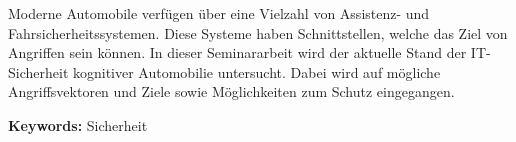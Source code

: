 Moderne Automobile verfügen über eine Vielzahl von Assistenz- und
Fahrsicherheitssystemen. Diese Systeme haben Schnittstellen, welche das Ziel
von Angriffen sein können. In dieser Seminararbeit wird der aktuelle Stand der
IT-Sicherheit kognitiver Automobilie untersucht. Dabei wird auf mögliche
Angriffsvektoren und Ziele sowie Möglichkeiten zum Schutz eingegangen.

\textbf{Keywords:} Sicherheit
